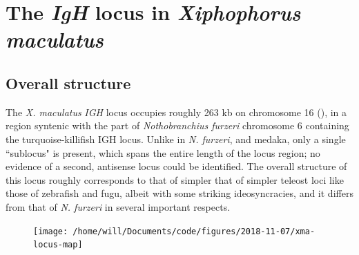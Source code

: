 \section{The \textit{IgH} locus in \textit{Xiphophorus maculatus}}
\label{sec:xma-locus}

	\subsection{Overall structure}
	
	The \textit{X. maculatus} \textit{IGH} locus occupies roughly 263 kb on chromosome 16 (), in a region syntenic with the part of \textit{Nothobranchius furzeri} chromosome 6 containing the turquoise-killifish IGH locus. %
	Unlike in \textit{N. furzeri}, and medaka, only a single ``sublocus" is present, which spans the entire length of the locus region; no evidence of a second, antisense locus could be identified. The overall structure of this locus roughly corresponds to that of simpler that of simpler teleost loci like those of zebrafish and fugu, albeit with some striking ideosyncracies, and it differs from that of \textit{N. furzeri} in several important respects.
	
	\begin{figure}
	\centering
	\texttt{[image: /home/will/Documents/code/figures/2018-11-07/xma-locus-map]}
	\caption[The immunoglobulin heavy chain (\textit{IGH}) locus in \textit{}]{\textbf{The immunoglobulin heavy chain (\textit{IGH}) locus in \textit{Xiphophorus maculatus}:} (A) Position of the \textit{IGH} locus on chromosome (group) 16 of the \textit{X. maculatus} genome. (B) Arrangement of VH, DH, JH and constant-region gene segments on the \textit{X. maculatus} \textit{IgH} locus. (C) Detailed map of the \textit{IGHZ} and \textit{IGHM/D} constant regions, indicating the position and identity of the constant-region exons and the exon composition of expressed \textit{IgH} isoforms in \textit{X. maculatus}.}
	\begin{subfigure}{0em}
        \label{fig:xma-locus-map-a}
    \end{subfigure}
    \begin{subfigure}{0em}
        \label{fig:xma-locus-map-b}
    \end{subfigure}
    \begin{subfigure}{0em}
        \label{fig:xma-locus-map-c}
    \end{subfigure}
	\label{fig:xma-locus-map}
\end{figure}

